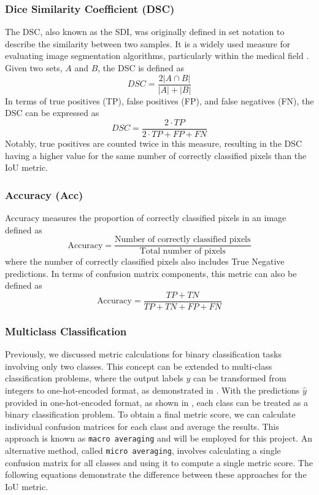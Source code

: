 \subsubsection*{Dice Similarity Coefficient (DSC)}
\label{subsubsec:dice_similarity_coefficient}
The \ac{DSC}, also known as the \ac{SDI}, was originally defined in set notation to describe the similarity between two samples. It is a widely used measure for evaluating image segmentation algorithms, particularly within the medical field \cite{Carass2020-rj}. Given two sets, $A$ and $B$, the \ac{DSC} is defined as
\begin{equation}
    DSC=\frac{2|A\cap B|}{|A|+|B|}
\end{equation}
In terms of true positives (TP), false positives (FP), and false negatives (FN), the \ac{DSC} can be expressed as
\begin{equation}
    DSC=\frac{2\cdot TP}{2\cdot TP + FP + FN}
\end{equation}
Notably, true positives are counted twice in this measure, resulting in the \ac{DSC} having a higher value for the same number of correctly classified pixels than the \ac{IoU} metric.

\subsubsection*{Accuracy (Acc)}
\label{subsubsec:accuracy}
Accuracy measures the proportion of correctly classified pixels in an image defined as
\begin{equation}
    \text{Accuracy}=\frac{\text{Number of correctly classified pixels}}{\text{Total number of pixels}}
\end{equation}
where the number of correctly classified pixels also includes True Negative predictions. In terms of confusion matrix components, this metric can also be defined as
\begin{equation}
    \text{Accuracy}=\frac{TP+TN}{TP+TN+FP+FN}
\end{equation}

\subsubsection*{Multiclass Classification}
Previously, we discussed metric calculations for binary classification tasks involving only two classes. This concept can be extended to multi-class classification problems, where the output labels $y$ can be transformed from integers to one-hot-encoded format, as demonstrated in . With the predictions $\hat{y}$ provided in one-hot-encoded format, as shown in , each class can be treated as a binary classification problem. To obtain a final metric score, we can calculate individual confusion matrices for each class and average the results. This approach is known as \texttt{macro averaging} and will be employed for this project. An alternative method, called \texttt{micro averaging}, involves calculating a single confusion matrix for all classes and using it to compute a single metric score. The following equations demonstrate the difference between these approaches for the \acf{IoU} metric.

